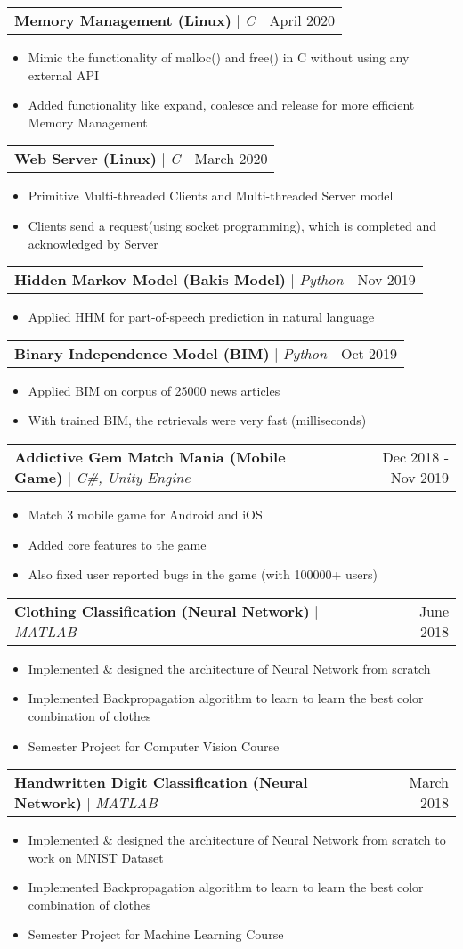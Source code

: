 \documentclass[letterpaper,11pt]{article}
\makeatletter
\newcommand{\resumeItem}[1]{
  \item\small{
    {#1 \vspace{-2pt}}
  }
}
\newcommand{\resumeProjectHeading}[2]{
    \item
    \begin{tabular*}{0.97\textwidth}{l@{\extracolsep{\fill}}r}
      \small#1 & #2 \\
    \end{tabular*}\vspace{-7pt}
}
\newcommand{\resumeItemListStart}{\begin{itemize}}
\newcommand{\resumeItemListEnd}{\end{itemize}\vspace{-5pt}}
\makeatother
\begin{document}
      \resumeProjectHeading
          {\textbf{Memory Management (Linux)} $|$ \emph{C}}{April 2020}
          \resumeItemListStart
            \resumeItem{Mimic the functionality of malloc() and free() in C without using any external API }
            \resumeItem {Added functionality like expand, coalesce and release for more efficient Memory Management}
          \resumeItemListEnd          
          
      \resumeProjectHeading
          {\textbf{Web Server (Linux)} $|$ \emph{C}}{March 2020}
          \resumeItemListStart
            \resumeItem{Primitive Multi-threaded Clients and Multi-threaded Server model }
            \resumeItem{Clients send a request(using socket programming), which is completed and acknowledged by Server}
          \resumeItemListEnd     

      \resumeProjectHeading
          {\textbf{Hidden Markov Model (Bakis Model)} $|$ \emph{Python}}{Nov 2019}
          \resumeItemListStart
            \resumeItem{Applied HHM for part-of-speech prediction in natural language}
          \resumeItemListEnd 

      \resumeProjectHeading
          {\textbf{Binary Independence Model (BIM)} $|$ \emph{Python}}{Oct 2019}
          \resumeItemListStart
            \resumeItem{Applied BIM on corpus of 25000 news articles}
            \resumeItem{With trained BIM, the retrievals were very fast (milliseconds)}
          \resumeItemListEnd 

      \resumeProjectHeading
          {\textbf{Addictive Gem Match Mania (Mobile Game)} $|$ \emph{C\#, Unity Engine}}{Dec 2018 - Nov 2019}
          \resumeItemListStart
            \resumeItem{Match 3 mobile game for Android and iOS}
            \resumeItem{Added core features to the game}
            \resumeItem{Also fixed user reported bugs in the game (with 100000+ users)}
          \resumeItemListEnd
          
      \resumeProjectHeading
          {\textbf{Clothing Classification (Neural Network)} $|$ \emph{MATLAB}}{June 2018}
          \resumeItemListStart
            \resumeItem{Implemented \& designed the architecture of Neural Network from scratch}
            \resumeItem{Implemented Backpropagation algorithm to learn to learn the best color combination of clothes}
            \resumeItem{Semester Project for Computer Vision Course}
          \resumeItemListEnd 

      \resumeProjectHeading
          {\textbf{Handwritten Digit Classification (Neural Network) } $|$ \emph{MATLAB}}{March 2018}
          \resumeItemListStart
            \resumeItem{Implemented \& designed the architecture of Neural Network from scratch to work on MNIST Dataset}
            \resumeItem{Implemented Backpropagation algorithm to learn to learn the best color combination of clothes}
            \resumeItem{Semester Project for Machine Learning Course}
          \resumeItemListEnd
\end{document}
